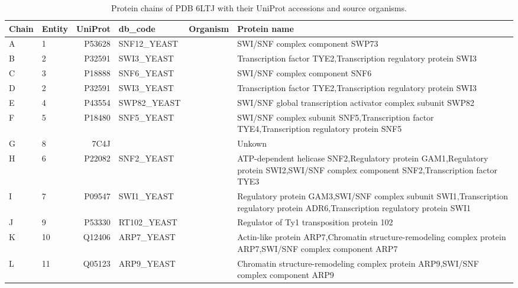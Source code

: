 \begin{table}[htbp]
  \centering\small
  \begin{tabular}{@{}llrllp{6.5cm}@{}}
    \toprule
    Chain & Entity & \multicolumn{1}{c}{UniProt} & db\_code & Organism & Protein name \\
    \midrule
    A & 1 & P53628 & SNF12_YEAST &  & SWI/SNF complex component SWP73 \\
    B & 2 & P32591 & SWI3_YEAST &  & Transcription factor TYE2,Transcription regulatory protein SWI3 \\
    C & 3 & P18888 & SNF6_YEAST &  & SWI/SNF complex component SNF6 \\
    D & 2 & P32591 & SWI3_YEAST &  & Transcription factor TYE2,Transcription regulatory protein SWI3 \\
    E & 4 & P43554 & SWP82_YEAST &  & SWI/SNF global transcription activator complex subunit SWP82 \\
    F & 5 & P18480 & SNF5_YEAST &  & SWI/SNF complex subunit SNF5,Transcription factor TYE4,Transcription regulatory protein SNF5 \\
    G & 8 & 7C4J &  &  & Unkown \\
    H & 6 & P22082 & SNF2_YEAST &  & ATP-dependent helicase SNF2,Regulatory protein GAM1,Regulatory protein SWI2,SWI/SNF complex component SNF2,Transcription factor TYE3 \\
    I & 7 & P09547 & SWI1_YEAST &  & Regulatory protein GAM3,SWI/SNF complex subunit SWI1,Transcription regulatory protein ADR6,Transcription regulatory protein SWI1 \\
    J & 9 & P53330 & RT102_YEAST &  & Regulator of Ty1 transposition protein 102 \\
    K & 10 & Q12406 & ARP7_YEAST &  & Actin-like protein ARP7,Chromatin structure-remodeling complex protein ARP7,SWI/SNF complex component ARP7 \\
    L & 11 & Q05123 & ARP9_YEAST &  & Chromatin structure-remodeling complex protein ARP9,SWI/SNF complex component ARP9 \\
    \bottomrule
  \end{tabular}
  \caption{Protein chains of PDB 6LTJ with their UniProt accessions and source organisms.}
  \label{tab:6ltj_chains_uniprot}
\end{table}
